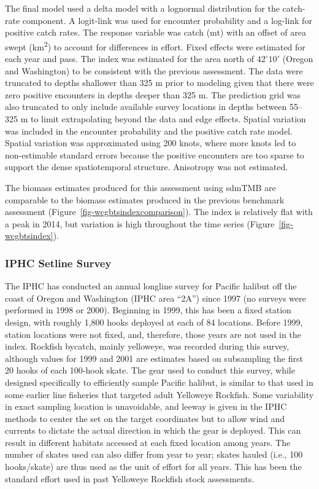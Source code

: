 \documentclass[
]{scrartcl}
\begin{document}
The final model used a delta model with a lognormal distribution for the
catch-rate component. A logit-link was used for encounter probability
and a log-link for positive catch rates. The response variable was catch
(mt) with an offset of area swept (km\textsuperscript{2}) to account for
differences in effort. Fixed effects were estimated for each year and
pass. The index was estimated for the area north of \(42^{\circ}10'\)
(Oregon and Washington) to be consistent with the previous assessment.
The data were truncated to depths shallower than 325 m prior to modeling
given that there were zero positive encounters in depths deeper than 325
m. The prediction grid was also truncated to only include available
survey locations in depths between 55--325 m to limit extrapolating
beyond the data and edge effects. Spatial variation was included in the
encounter probability and the positive catch rate model. Spatial
variation was approximated using 200 knots, where more knots led to
non-estimable standard errors because the positive encounters are too
sparse to support the dense spatiotemporal structure. Anisotropy was not
estimated.

The biomass estimates produced for this assessment using sdmTMB are
comparable to the biomass estimates produced in the previous benchmark
assessment (Figure~\ref{fig-wcgbtsindexcomparison}). The index is
relatively flat with a peak in 2014, but variation is high throughout
the time series (Figure~\ref{fig-wcgbtsindex}).

\subsubsection{IPHC Setline Survey}\label{iphc-setline-survey}

The IPHC has conducted an annual longline survey for Pacific halibut off
the coast of Oregon and Washington (IPHC area ``2A'') since 1997 (no
surveys were performed in 1998 or 2000). Beginning in 1999, this has
been a fixed station design, with roughly 1,800 hooks deployed at each
of 84 locations. Before 1999, station locations were not fixed, and,
therefore, those years are not used in the index. Rockfish bycatch,
mainly yelloweye, was recorded during this survey, although values for
1999 and 2001 are estimates based on subsampling the first 20 hooks of
each 100-hook skate. The gear used to conduct this survey, while
designed specifically to efficiently sample Pacific halibut, is similar
to that used in some earlier line fisheries that targeted adult
Yelloweye Rockfish. Some variability in exact sampling location is
unavoidable, and leeway is given in the IPHC methods to center the set
on the target coordinates but to allow wind and currents to dictate the
actual direction in which the gear is deployed. This can result in
different habitats accessed at each fixed location among years. The
number of skates used can also differ from year to year; skates hauled
(i.e., 100 hooks/skate) are thus used as the unit of effort for all
years. This has been the standard effort used in past Yelloweye Rockfish
stock assessments.
\end{document}
